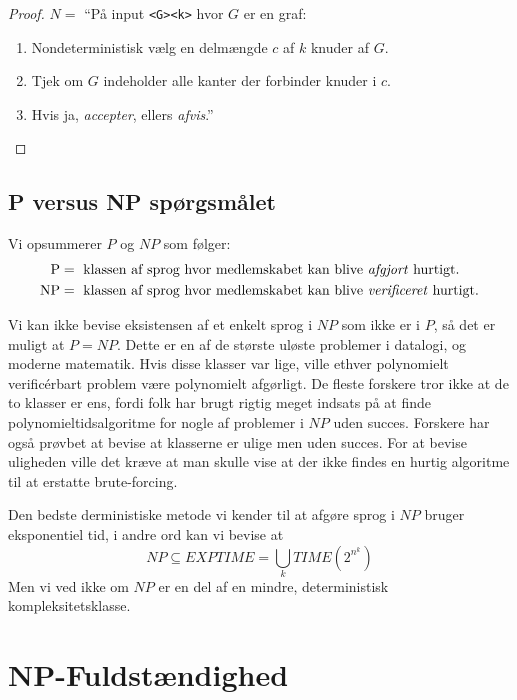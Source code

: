 \begin{proof}
  $N = $ ``På input \texttt{<G><k>} hvor $G$ er en graf:
  \begin{enumerate}
    \item Nondeterministisk vælg en delmængde $c$ af $k$ knuder af $G$.
    \item Tjek om $G$ indeholder alle kanter der forbinder knuder i $c$.
    \item Hvis ja, \textit{accepter}, ellers \textit{afvis}.''
  \end{enumerate}
\end{proof}

\subsection{P versus NP spørgsmålet}%
\label{subsec:pvsnp}

Vi opsummerer $P$ og $NP$ som følger:
\begin{align*}
\text{P} &= \text{ klassen af sprog hvor medlemskabet kan blive \textit{afgjort} hurtigt.} \\
  \text{NP} &= \text{ klassen af sprog hvor medlemskabet kan blive \textit{verificeret} hurtigt.}
\end{align*}

Vi kan ikke bevise eksistensen af et enkelt sprog i $NP$ som ikke er i $P$, så det er muligt at $P = NP$. Dette er en af de største uløste problemer i datalogi, og moderne matematik. Hvis disse klasser var lige, ville ethver polynomielt verificérbart problem være polynomielt afgørligt. De fleste forskere tror ikke at de to klasser er ens, fordi folk har brugt rigtig meget indsats  på at finde polynomieltidsalgoritme for nogle af problemer i $NP$ uden succes. Forskere har også prøvbet at bevise at klasserne er ulige men uden succes. For at bevise uligheden ville det kræve at man skulle vise at der ikke findes en hurtig algoritme til at erstatte brute-forcing.

Den bedste derministiske metode vi kender til at afgøre sprog i $NP$ bruger eksponentiel tid, i andre ord kan vi bevise at
\begin{equation*}
NP \subseteq EXPTIME = \bigcup_{k} TIME (2^{n^{k}})
\end{equation*}
Men vi ved ikke om $NP$ er en del af en mindre, deterministisk kompleksitetsklasse.

\section{NP-Fuldstændighed}%
\label{sec:npcompleteness}

